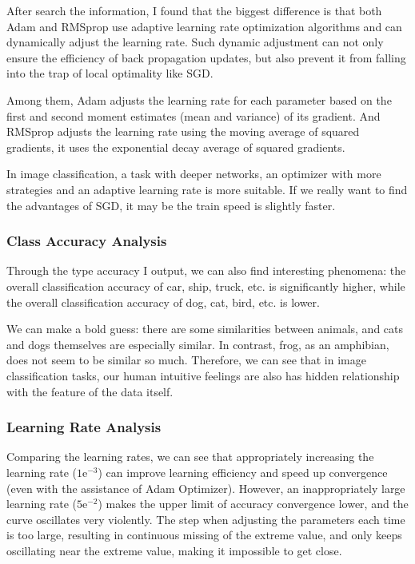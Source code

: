 After search the information, I found that the biggest difference is that both Adam and RMSprop use adaptive learning rate optimization algorithms and can dynamically adjust the learning rate.
Such dynamic adjustment can not only ensure the efficiency of back propagation updates, but also prevent it from falling into the trap of local optimality like SGD.

Among them, Adam adjusts the learning rate for each parameter based on the first and second moment estimates (mean and variance) of its gradient.
And RMSprop adjusts the learning rate using the moving average of squared gradients, it uses the exponential decay average of squared gradients.

In image classification, a task with deeper networks, an optimizer with more strategies and an adaptive learning rate is more suitable.
If we really want to find the advantages of SGD, it may be the train speed is slightly faster.

\subsubsection{Class Accuracy Analysis}

Through the type accuracy I output, we can also find interesting phenomena:
the overall classification accuracy of car, ship, truck, etc. is significantly higher, while the overall classification accuracy of dog, cat, bird, etc. is lower.

We can make a bold guess: there are some similarities between animals, and cats and dogs themselves are especially similar. In contrast, frog, as an amphibian, does not seem to be similar so much.
Therefore, we can see that in image classification tasks, our human intuitive feelings are also has hidden relationship with the feature of the data itself.

\subsubsection{Learning Rate Analysis}

Comparing the learning rates, we can see that appropriately increasing the learning rate ($1\mathrm{e}^{-3}$) can improve learning efficiency and speed up convergence (even with the assistance of Adam Optimizer).
However, an inappropriately large learning rate ($5\mathrm{e}^{-2}$) makes the upper limit of accuracy convergence lower, and the curve oscillates very violently.
The step when adjusting the parameters each time is too large, resulting in continuous missing of the extreme value, and only keeps oscillating near the extreme value, making it impossible to get close.

